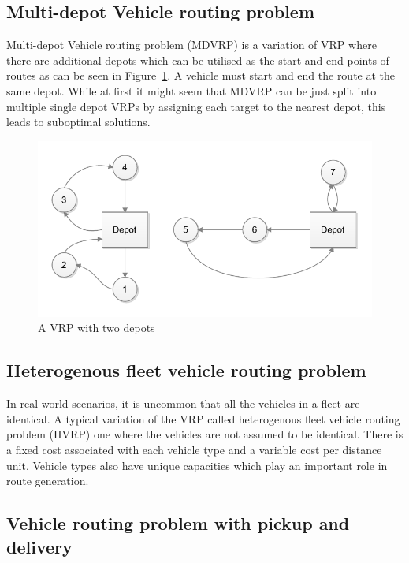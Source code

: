 \subsection{Multi-depot Vehicle routing problem}

Multi-depot Vehicle routing problem (MDVRP) is a variation of VRP where there are additional depots which can be utilised as the start and end points of routes as can be seen in Figure~\ref{fig:multidepot}. A vehicle must start and end the route at the same depot. While at first it might seem that MDVRP can be just split into multiple single depot VRPs by assigning each target to the nearest depot, this leads to suboptimal solutions. \cite{salhi2014multi}

\begin{figure}[h]
  \begin{center}
    \includegraphics{images/multidepot.pdf}
    \caption{A VRP with two depots}
    \label{fig:multidepot}
  \end{center}
\end{figure}

\subsection{Heterogenous fleet vehicle routing problem}

In real world scenarios, it is uncommon that all the vehicles in a fleet are identical. A typical variation of the VRP called heterogenous fleet vehicle routing problem (HVRP) one where the vehicles are not assumed to be identical. There is a fixed cost associated with each vehicle type and a variable cost per distance unit. Vehicle types also have unique capacities which play an important role in route generation. \cite{gendreau1999tabu}


\subsection{Vehicle routing problem with pickup and delivery}

